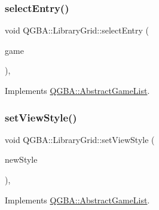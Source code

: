 \mbox{\label{class_q_g_b_a_1_1_library_grid_a2fa487333a0fffa668823370c73477c1}} 
\subsubsection{\texorpdfstring{select\+Entry()}{selectEntry()}}
{\footnotesize\ttfamily void Q\+G\+B\+A\+::\+Library\+Grid\+::select\+Entry (\begin{DoxyParamCaption}\item[{\mbox{\hyperlink{namespace_q_g_b_a_a201fa9f2cb8f778666a134ba81909358}{Library\+Entry\+Ref}}}]{game }\end{DoxyParamCaption})\hspace{0.3cm}{\ttfamily [override]}, {\ttfamily [virtual]}}



Implements \mbox{\hyperlink{class_q_g_b_a_1_1_abstract_game_list_af39316d3b224014e8a2763561e1cdcdd}{Q\+G\+B\+A\+::\+Abstract\+Game\+List}}.

\mbox{\label{class_q_g_b_a_1_1_library_grid_a5a2c5ce5dcd4452e7971f8eff5c3c7bd}} 
\subsubsection{\texorpdfstring{set\+View\+Style()}{setViewStyle()}}
{\footnotesize\ttfamily void Q\+G\+B\+A\+::\+Library\+Grid\+::set\+View\+Style (\begin{DoxyParamCaption}\item[{\mbox{\hyperlink{namespace_q_g_b_a_a4804d48d02699a2c1d2436e9269a8bb8}{Library\+Style}}}]{new\+Style }\end{DoxyParamCaption})\hspace{0.3cm}{\ttfamily [override]}, {\ttfamily [virtual]}}



Implements \mbox{\hyperlink{class_q_g_b_a_1_1_abstract_game_list_af2f88dba7da390c2d89a362bafc5a6e4}{Q\+G\+B\+A\+::\+Abstract\+Game\+List}}.

